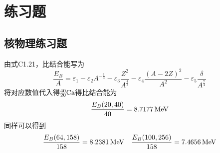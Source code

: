\chapter{练习题}

\section{核物理练习题}

\begin{exercise}
    由式C1.21，比结合能写为
    \begin{equation}
        \frac{E_{B}}{A} =   \varepsilon_1 - \varepsilon_2 A^{-\frac{1}{3}}
                          - \varepsilon_3 \frac{Z^2}{A^{\frac{4}{3}}} 
                          - \varepsilon_4 \frac{(A - 2Z)^2}{A^2}
                          - \varepsilon_5 \frac{\delta}{A^{\frac{7}{4}}}
    \end{equation}
    将对应数值代入得$^{40}_{20}{\rm Ca}$得比结合能为
    \begin{equation*}
        \frac{E_{B}(20, 40)}{40} = 8.7177\, {\rm MeV}
    \end{equation*}
    同样可以得到
    \begin{equation*}
        \frac{E_{B}(64, 158)}{158} = 8.2381\, {\rm MeV}
        \quad
        \frac{E_{B}(100, 256)}{158} = 7.4656\, {\rm MeV}
    \end{equation*}
\end{exercise}

